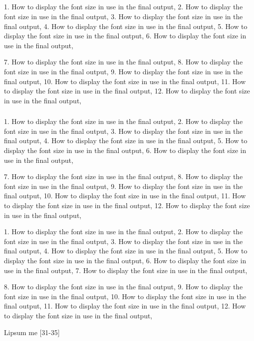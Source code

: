 \subsection{\showfont}

1. How to display the font size in use in the final output,
2. How to display the font size in use in the final output,
3. How to display the font size in use in the final output,
4. How to display the font size in use in the final output,
5. How to display the font size in use in the final output,
6. How to display the font size in use in the final output,

7. How to display the font size in use in the final output,
8. How to display the font size in use in the final output,
9. How to display the font size in use in the final output,
10. How to display the font size in use in the final output,
11. How to display the font size in use in the final output,
12. How to display the font size in use in the final output,

\subsubsection{\showfont}

1. How to display the font size in use in the final output,
2. How to display the font size in use in the final output,
3. How to display the font size in use in the final output,
4. How to display the font size in use in the final output,
5. How to display the font size in use in the final output,
6. How to display the font size in use in the final output,

7. How to display the font size in use in the final output,
8. How to display the font size in use in the final output,
9. How to display the font size in use in the final output,
10. How to display the font size in use in the final output,
11. How to display the font size in use in the final output,
12. How to display the font size in use in the final output,

\subsubsubsection{\showfont}

1. How to display the font size in use in the final output,
2. How to display the font size in use in the final output,
3. How to display the font size in use in the final output,
4. How to display the font size in use in the final output,
5. How to display the font size in use in the final output,
6. How to display the font size in use in the final output,
7. How to display the font size in use in the final output,

8. How to display the font size in use in the final output,
9. How to display the font size in use in the final output,
10. How to display the font size in use in the final output,
11. How to display the font size in use in the final output,
12. How to display the font size in use in the final output,


Lipsum me [31-35]


